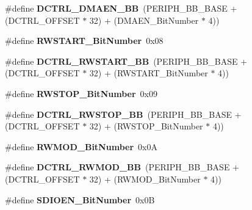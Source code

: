 \begin{DoxyCompactItemize}
\item 
\hypertarget{group___s_d_i_o_ga43f7336d4f955c6cf1f676ccbc043fe9}{\#define {\bfseries D\-C\-T\-R\-L\-\_\-\-D\-M\-A\-E\-N\-\_\-\-B\-B}~(P\-E\-R\-I\-P\-H\-\_\-\-B\-B\-\_\-\-B\-A\-S\-E + (D\-C\-T\-R\-L\-\_\-\-O\-F\-F\-S\-E\-T $\ast$ 32) + (D\-M\-A\-E\-N\-\_\-\-Bit\-Number $\ast$ 4))}\label{group___s_d_i_o_ga43f7336d4f955c6cf1f676ccbc043fe9}

\item 
\hypertarget{group___s_d_i_o_ga773045c51d3e8daee0c181517c44a2df}{\#define {\bfseries R\-W\-S\-T\-A\-R\-T\-\_\-\-Bit\-Number}~0x08}\label{group___s_d_i_o_ga773045c51d3e8daee0c181517c44a2df}

\item 
\hypertarget{group___s_d_i_o_gac776c39dfac0e1ed007217133e1145c3}{\#define {\bfseries D\-C\-T\-R\-L\-\_\-\-R\-W\-S\-T\-A\-R\-T\-\_\-\-B\-B}~(P\-E\-R\-I\-P\-H\-\_\-\-B\-B\-\_\-\-B\-A\-S\-E + (D\-C\-T\-R\-L\-\_\-\-O\-F\-F\-S\-E\-T $\ast$ 32) + (R\-W\-S\-T\-A\-R\-T\-\_\-\-Bit\-Number $\ast$ 4))}\label{group___s_d_i_o_gac776c39dfac0e1ed007217133e1145c3}

\item 
\hypertarget{group___s_d_i_o_gae8c0654ad5cba23281bcfa77ef19b9cf}{\#define {\bfseries R\-W\-S\-T\-O\-P\-\_\-\-Bit\-Number}~0x09}\label{group___s_d_i_o_gae8c0654ad5cba23281bcfa77ef19b9cf}

\item 
\hypertarget{group___s_d_i_o_ga678da1db835676b0fb1976cf3408e2d1}{\#define {\bfseries D\-C\-T\-R\-L\-\_\-\-R\-W\-S\-T\-O\-P\-\_\-\-B\-B}~(P\-E\-R\-I\-P\-H\-\_\-\-B\-B\-\_\-\-B\-A\-S\-E + (D\-C\-T\-R\-L\-\_\-\-O\-F\-F\-S\-E\-T $\ast$ 32) + (R\-W\-S\-T\-O\-P\-\_\-\-Bit\-Number $\ast$ 4))}\label{group___s_d_i_o_ga678da1db835676b0fb1976cf3408e2d1}

\item 
\hypertarget{group___s_d_i_o_gad7b722671f65e79d1be2899b643278ad}{\#define {\bfseries R\-W\-M\-O\-D\-\_\-\-Bit\-Number}~0x0\-A}\label{group___s_d_i_o_gad7b722671f65e79d1be2899b643278ad}

\item 
\hypertarget{group___s_d_i_o_gad34bfe8650534ce24320ae83886c91e3}{\#define {\bfseries D\-C\-T\-R\-L\-\_\-\-R\-W\-M\-O\-D\-\_\-\-B\-B}~(P\-E\-R\-I\-P\-H\-\_\-\-B\-B\-\_\-\-B\-A\-S\-E + (D\-C\-T\-R\-L\-\_\-\-O\-F\-F\-S\-E\-T $\ast$ 32) + (R\-W\-M\-O\-D\-\_\-\-Bit\-Number $\ast$ 4))}\label{group___s_d_i_o_gad34bfe8650534ce24320ae83886c91e3}

\item 
\hypertarget{group___s_d_i_o_ga37f3e1612e0dae8160be978ebfa54301}{\#define {\bfseries S\-D\-I\-O\-E\-N\-\_\-\-Bit\-Number}~0x0\-B}\label{group___s_d_i_o_ga37f3e1612e0dae8160be978ebfa54301}


\end{DoxyCompactItemize}
